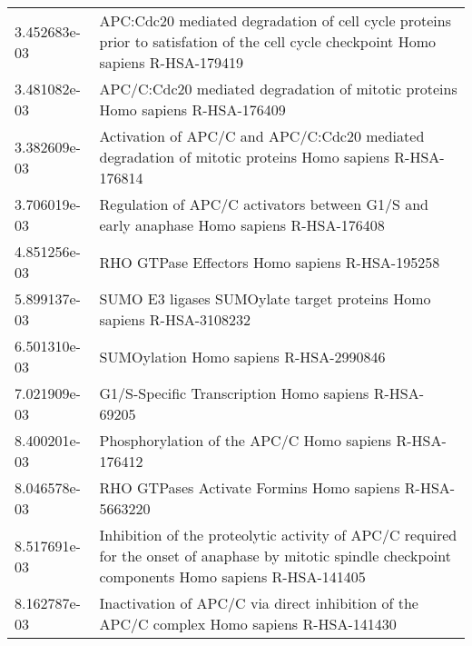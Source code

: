 \begin{longtable}{p{2.4cm}p{14.5cm}}
             3.452683e-03 &                      APC:Cdc20 mediated degradation of cell cycle proteins prior to satisfation of the cell cycle checkpoint Homo sapiens R-HSA-179419 \\
             3.481082e-03 &                                                                         APC/C:Cdc20 mediated degradation of mitotic proteins Homo sapiens R-HSA-176409 \\
             3.382609e-03 &                                                 Activation of APC/C and APC/C:Cdc20 mediated degradation of mitotic proteins Homo sapiens R-HSA-176814 \\
             3.706019e-03 &                                                               Regulation of APC/C activators between G1/S and early anaphase Homo sapiens R-HSA-176408 \\
             4.851256e-03 &                                                                                                         RHO GTPase Effectors Homo sapiens R-HSA-195258 \\
             5.899137e-03 &                                                                                   SUMO E3 ligases SUMOylate target proteins Homo sapiens R-HSA-3108232 \\
             6.501310e-03 &                                                                                                                 SUMOylation Homo sapiens R-HSA-2990846 \\
             7.021909e-03 &                                                                                                   G1/S-Specific Transcription Homo sapiens R-HSA-69205 \\
             8.400201e-03 &                                                                                                 Phosphorylation of the APC/C Homo sapiens R-HSA-176412 \\
             8.046578e-03 &                                                                                                RHO GTPases Activate Formins Homo sapiens R-HSA-5663220 \\
             8.517691e-03 &  Inhibition of the proteolytic activity of APC/C required for the onset of anaphase by mitotic spindle checkpoint components Homo sapiens R-HSA-141405 \\
             8.162787e-03 &                                                             Inactivation of APC/C via direct inhibition of the APC/C complex Homo sapiens R-HSA-141430 \\

\end{longtable}
